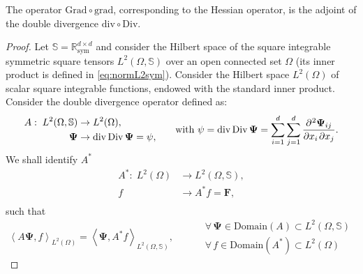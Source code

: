 \begin{theorem}
	The operator $\mathrm{Grad} \circ \mathrm{grad}$, corresponding to the Hessian operator, is the adjoint of the double divergence $\mathrm{div} \circ \mathrm{Div}$.
	\begin{proof}
		Let $\mathbb{S} = \mathbb{R}^{d \times d}_{\text{sym}}$ and consider the Hilbert space of the square integrable symmetric square tensors  $L^2(\Omega, \mathbb{S})$ over an open connected set $\Omega$ (its inner product is defined in \eqref{eq:normL2sym}). 		Consider the Hilbert space $L^2(\Omega)$ of scalar square integrable functions, endowed with the standard inner product. Consider the double divergence operator defined as: 
		\begin{equation*}
		\begin{aligned}
		A: \; L^2(\Omega, \mathbb{S})& \rightarrow L^2(\Omega), \\
		\bm{\Psi}& \rightarrow \div\Div \bm{\Psi} = \psi, \\	\end{aligned}
		\qquad \text{with } \psi = \div\Div \bm{\Psi} = \sum_{i = 1}^d \sum_{j = 1}^d \diffp{\bm{\Psi}_{ij}}{x_i,x_j}.
		\end{equation*}
		We {shall} identify $A^*$
		\begin{equation*}
		\begin{aligned}
		A^*: \; L^2(\Omega)& \rightarrow L^2(\Omega, \mathbb{S}), \\
		f& \rightarrow  A^* f = \bm{F}, \\
		\end{aligned}
		\end{equation*}
		such that 
		\begin{equation*}
		\left\langle A \bm{\Psi} , f \right\rangle_{L^2(\Omega)} = \left\langle \bm{\Psi} , A^* f \right\rangle_{L^2(\Omega, \mathbb{S})},
		\begin{aligned} \qquad
		&\forall \,\bm{\Psi} \in \mathrm{Domain}(A) \subset L^2(\Omega, \mathbb{S}) \\
		&\forall \,f \in \mathrm{Domain}(A^*) \subset L^2(\Omega)
		\end{aligned}
		\end{equation*}
		

\end{proof}
\end{theorem}
